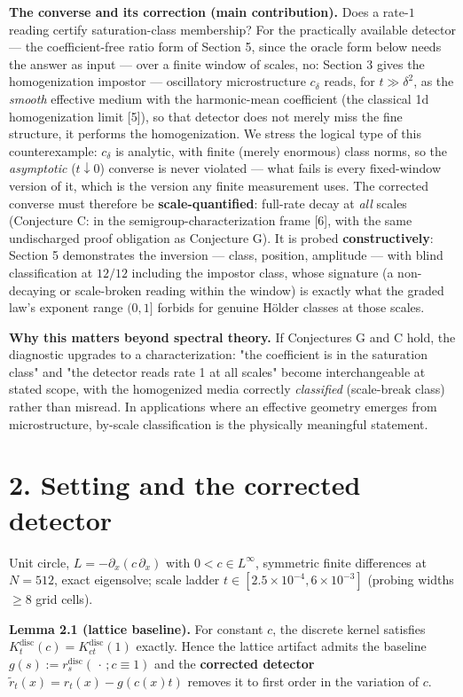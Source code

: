 \documentclass[11pt]{article}
\begin{document}
\textbf{The converse and its correction (main contribution).}  Does a rate-$1$ reading certify saturation-class membership?  For the practically available detector — the coefficient-free ratio form of Section 5, since the oracle form below needs the answer as input — over a finite window of scales, no: Section 3 gives the homogenization impostor — oscillatory microstructure $c_\delta$ reads, for $t \gg \delta^2$, as the \emph{smooth} effective medium with the harmonic-mean coefficient (the classical 1d homogenization limit [5]), so that detector does not merely miss the fine structure, it performs the homogenization.  We stress the logical type of this counterexample: $c_\delta$ is analytic, with finite (merely enormous) class norms, so the \emph{asymptotic} ($t \downarrow 0$) converse is never violated — what fails is every fixed-window version of it, which is the version any finite measurement uses.  The corrected converse must therefore be \textbf{scale-quantified}: full-rate decay at \emph{all} scales (Conjecture C: in the semigroup-characterization frame [6], with the same undischarged proof obligation as Conjecture G).  It is probed \textbf{constructively}: Section 5 demonstrates the inversion — class, position, amplitude — with blind classification at $12/12$ including the impostor class, whose signature (a non-decaying or scale-broken reading within the window) is exactly what the graded law's exponent range $(0,1]$ forbids for genuine Hölder classes at those scales.

\textbf{Why this matters beyond spectral theory.}  If Conjectures G and C hold, the diagnostic upgrades to a characterization: "the coefficient is in the saturation class" and "the detector reads rate 1 at all scales" become interchangeable at stated scope, with the homogenized media correctly \emph{classified} (scale-break class) rather than misread.  In applications where an effective geometry emerges from microstructure, by-scale classification is the physically meaningful statement.

\section*{2. Setting and the corrected detector}
Unit circle, $L = -\partial_x(c\,\partial_x)$ with $0 < c \in L^\infty$, symmetric finite differences at $N = 512$, exact eigensolve; scale ladder $t \in [2.5\times 10^{-4}, 6\times 10^{-3}]$ (probing widths $\ge 8$ grid cells).

\textbf{Lemma 2.1 (lattice baseline).}  For constant $c$, the discrete kernel satisfies $K^{\mathrm{disc}}_t(c) = K^{\mathrm{disc}}_{ct}(1)$ exactly.  Hence the lattice artifact admits the baseline $g(s) := r^{\mathrm{disc}}_s(\,\cdot\,; c \equiv 1)$ and the \textbf{corrected detector} $\tilde r_t(x) = r_t(x) - g(c(x)t)$ removes it to first order in the variation of $c$.
\end{document}
